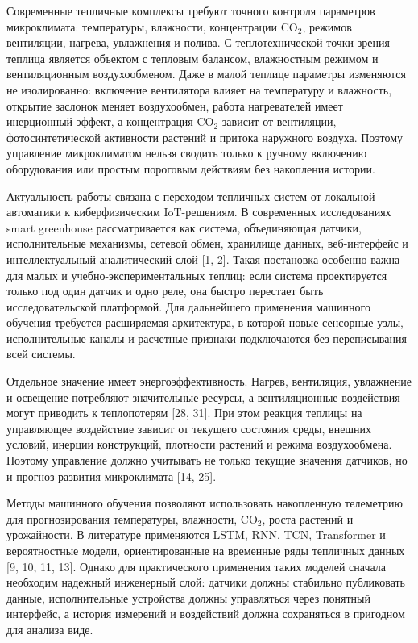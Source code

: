\documentclass[a4paper,14pt]{extarticle}
\begin{document}
Современные тепличные комплексы требуют точного контроля параметров
микроклимата: температуры, влажности, концентрации CO\(_2\), режимов
вентиляции, нагрева, увлажнения и полива. С теплотехнической точки
зрения теплица является объектом с тепловым балансом, влажностным
режимом и вентиляционным воздухообменом. Даже в малой теплице параметры
изменяются не изолированно: включение вентилятора влияет на температуру
и влажность, открытие заслонок меняет воздухообмен, работа нагревателей
имеет инерционный эффект, а концентрация CO\(_2\) зависит от вентиляции,
фотосинтетической активности растений и притока наружного воздуха.
Поэтому управление микроклиматом нельзя сводить только к ручному
включению оборудования или простым пороговым действиям без накопления
истории.

Актуальность работы связана с переходом тепличных систем от локальной
автоматики к киберфизическим IoT-решениям. В современных исследованиях
smart greenhouse рассматривается как система, объединяющая датчики,
исполнительные механизмы, сетевой обмен, хранилище данных, веб-интерфейс
и интеллектуальный аналитический слой {[}1, 2{]}. Такая постановка
особенно важна для малых и учебно-экспериментальных теплиц: если система
проектируется только под один датчик и одно реле, она быстро перестает
быть исследовательской платформой. Для дальнейшего применения машинного
обучения требуется расширяемая архитектура, в которой новые сенсорные
узлы, исполнительные каналы и расчетные признаки подключаются без
переписывания всей системы.

Отдельное значение имеет энергоэффективность. Нагрев, вентиляция,
увлажнение и освещение потребляют значительные ресурсы, а вентиляционные
воздействия могут приводить к теплопотерям {[}28, 31{]}. При этом
реакция теплицы на управляющее воздействие зависит от текущего состояния
среды, внешних условий, инерции конструкций, плотности растений и режима
воздухообмена. Поэтому управление должно учитывать не только текущие
значения датчиков, но и прогноз развития микроклимата {[}14, 25{]}.

Методы машинного обучения позволяют использовать накопленную телеметрию
для прогнозирования температуры, влажности, CO\(_2\), роста растений и
урожайности. В литературе применяются LSTM, RNN, TCN, Transformer и
вероятностные модели, ориентированные на временные ряды тепличных данных
{[}9, 10, 11, 13{]}. Однако для практического применения таких моделей
сначала необходим надежный инженерный слой: датчики должны стабильно
публиковать данные, исполнительные устройства должны управляться через
понятный интерфейс, а история измерений и воздействий должна сохраняться
в пригодном для анализа виде.
\end{document}
